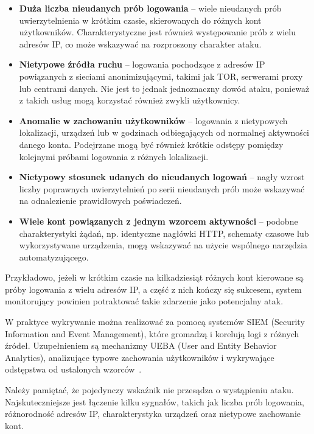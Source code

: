 \documentclass[12pt,a4paper]{article}
\begin{document}
\begin{itemize}
    \item \textbf{Duża liczba nieudanych prób logowania} -- wiele nieudanych prób uwierzytelnienia w krótkim czasie, skierowanych do różnych kont użytkowników. Charakterystyczne jest również występowanie prób z wielu adresów IP, co może wskazywać na rozproszony charakter ataku.

    \item \textbf{Nietypowe źródła ruchu} -- logowania pochodzące z adresów IP powiązanych z sieciami anonimizującymi, takimi jak TOR, serwerami proxy lub centrami danych. Nie jest to jednak jednoznaczny dowód ataku, ponieważ z takich usług mogą korzystać również zwykli użytkownicy.

    \item \textbf{Anomalie w zachowaniu użytkowników} -- logowania z nietypowych lokalizacji, urządzeń lub w godzinach odbiegających od normalnej aktywności danego konta. Podejrzane mogą być również krótkie odstępy pomiędzy kolejnymi próbami logowania z różnych lokalizacji.

    \item \textbf{Nietypowy stosunek udanych do nieudanych logowań} -- nagły wzrost liczby poprawnych uwierzytelnień po serii nieudanych prób może wskazywać na odnalezienie prawidłowych poświadczeń.

    \item \textbf{Wiele kont powiązanych z jednym wzorcem aktywności} -- podobne charakterystyki żądań, np. identyczne nagłówki HTTP, schematy czasowe lub wykorzystywane urządzenia, mogą wskazywać na użycie wspólnego narzędzia automatyzującego.
\end{itemize}

Przykładowo, jeżeli w krótkim czasie na kilkadziesiąt różnych kont kierowane są próby logowania z wielu adresów IP, a część z nich kończy się sukcesem, system monitorujący powinien potraktować takie zdarzenie jako potencjalny atak.

W praktyce wykrywanie można realizować za pomocą systemów SIEM (Security Information and Event Management), które gromadzą i korelują logi z różnych źródeł. Uzupełnieniem są mechanizmy UEBA (User and Entity Behavior Analytics), analizujące typowe zachowania użytkowników i wykrywające odstępstwa od ustalonych wzorców~\cite{owasp_cs,mitre_t1110004}.

Należy pamiętać, że pojedynczy wskaźnik nie przesądza o wystąpieniu ataku. Najskuteczniejsze jest łączenie kilku sygnałów, takich jak liczba prób logowania, różnorodność adresów IP, charakterystyka urządzeń oraz nietypowe zachowanie kont.
\end{document}
